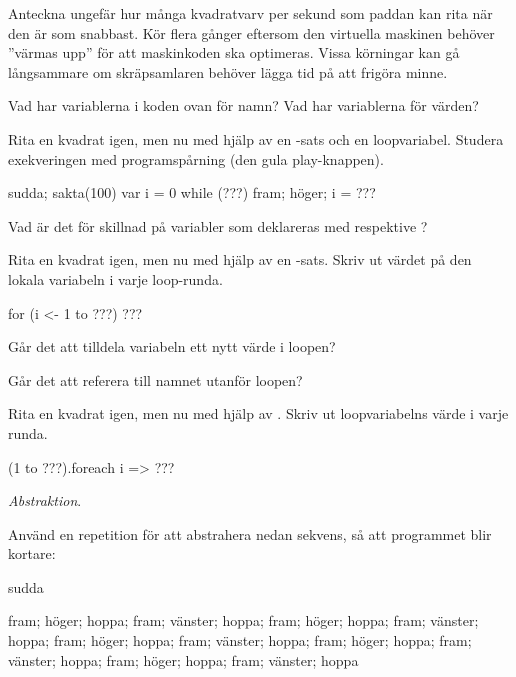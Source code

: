 \Subtask\Pen Anteckna ungefär hur många kvadratvarv per sekund som paddan kan rita när den är som snabbast. Kör flera gånger eftersom den virtuella maskinen behöver ''värmas upp'' för att maskinkoden ska optimeras. Vissa körningar kan gå långsammare om skräpsamlaren behöver lägga tid på att frigöra minne.

\Subtask\Pen Vad har variablerna i koden ovan för namn? Vad har variablerna för värden?

\Subtask Rita en kvadrat igen, men nu med hjälp av en -sats och en loopvariabel. Studera exekveringen med programspårning (den gula play-knappen).

\begin{Code}
sudda; sakta(100)
var i = 0
while (???) { fram; höger; i = ??? }
\end{Code}

\Subtask\Pen Vad är det för skillnad på variabler som deklareras med  respektive ?

\Subtask Rita en kvadrat igen, men nu med hjälp av en -sats. Skriv ut värdet på den lokala variabeln  i varje loop-runda.

\begin{Code}
for (i <- 1 to ???) { ??? }
\end{Code}

\Subtask\Pen Går det att tilldela variabeln  ett nytt värde i loopen?

\Subtask\Pen Går det att referera till namnet  utanför loopen?


\Subtask Rita en kvadrat igen, men nu med hjälp av . Skriv ut loopvariabelns värde i varje runda.

\begin{Code}
(1 to ???).foreach{ i => ??? }
\end{Code}



\Task \textit{Abstraktion}.

\Subtask Använd en repetition för att abstrahera nedan sekvens, så att programmet blir kortare:
\begin{Code}
sudda

fram; höger; hoppa; fram; vänster; hoppa; fram; höger;
hoppa; fram; vänster; hoppa; fram; höger; hoppa; fram;
vänster; hoppa; fram; höger; hoppa; fram; vänster; hoppa;
fram; höger; hoppa; fram; vänster; hoppa
\end{Code}

